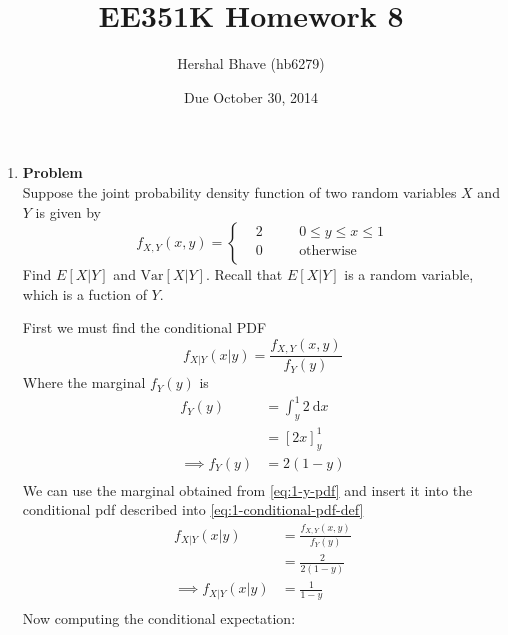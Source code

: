 \documentclass[12pt]{article}
\title{EE351K Homework 8}
\author{Hershal Bhave (hb6279)}
\date{Due October 30, 2014}
\newenvironment{Ex}{\textbf{Problem}\vspace{.75em}\\}{}
\newcommand{\dd}[1]{\:\mathrm{d}{#1}}
\begin{document}
\maketitle
\begin{enumerate}
\item
  \begin{Ex}
    Suppose the joint probability density function of two random
    variables $X$ and $Y$ is given by
    \begin{equation}
      \label{eq:1-question}
      f_{X,Y}(x,y) = \left\{
        \begin{aligned}
          & 2 &&\quad 0\le y \le x \le 1 \\
          & 0 &&\quad \text{otherwise} \\
        \end{aligned} \right.
    \end{equation}
    Find $E[X|Y]$ and $\text{Var}[X|Y]$. Recall that $E[X|Y]$ is a
    random variable, which is a fuction of $Y$.
    \begin{solution}
      First we must find the conditional PDF
      \begin{equation}
        \label{eq:1-conditional-pdf-def}
        f_{X|Y}(x|y) = \frac{f_{X,Y}(x,y)}{f_Y(y)}
      \end{equation}
      Where the marginal $f_Y(y)$ is
      \begin{equation}
        \label{eq:1-y-pdf}
        \begin{aligned}
          f_Y(y) &= \int_y^1 2\dd{x} \\
          &= [2x]_y^1 \\
          \implies f_Y(y) &= 2(1-y) \\
        \end{aligned}
      \end{equation}
      We can use the marginal obtained from \cref{eq:1-y-pdf} and insert
      it into the conditional pdf described into
      \cref{eq:1-conditional-pdf-def}
      \begin{equation}
        \label{eq:1-pdf-plugged}
        \begin{aligned}
          f_{X|Y}(x|y) &= \frac{f_{X,Y}(x,y)}{f_Y(y)} \\
          &= \frac{2}{2(1-y)} \\
          \implies f_{X|Y}(x|y) &= \frac{1}{1-y} \\
        \end{aligned}
      \end{equation}
      Now computing the conditional expectation:

\end{solution}
\end{Ex}
\end{enumerate}
\end{document}
